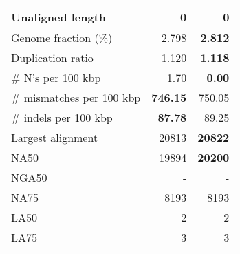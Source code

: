 \documentclass[12pt,a4paper]{article}
\begin{document}
\begin{table}[ht]
\begin{center}
\begin{tabular}{|l*{2}{|r}|}
Unaligned length & 0 & 0 \\ \hline
Genome fraction (\%) & 2.798 & {\bf 2.812} \\ \hline
Duplication ratio & 1.120 & {\bf 1.118} \\ \hline
\# N's per 100 kbp & 1.70 & {\bf 0.00} \\ \hline
\# mismatches per 100 kbp & {\bf 746.15} & 750.05 \\ \hline
\# indels per 100 kbp & {\bf 87.78} & 89.25 \\ \hline
Largest alignment & 20813 & {\bf 20822} \\ \hline
NA50 & 19894 & {\bf 20200} \\ \hline
NGA50 & - & - \\ \hline
NA75 & 8193 & 8193 \\ \hline
LA50 & 2 & 2 \\ \hline
LA75 & 3 & 3 \\ \hline
\end{tabular}
\end{center}
\end{table}
\end{document}
